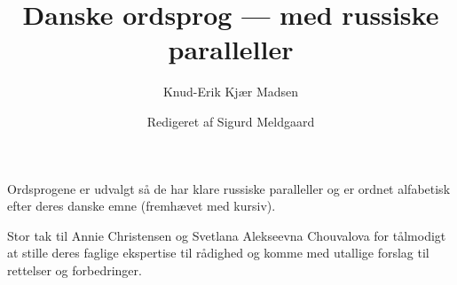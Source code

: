 \documentclass[a4paper]{article}
\title{Danske ordsprog --- med russiske paralleller}
\author{Knud-Erik Kjær Madsen \and Redigeret af Sigurd Meldgaard}
\date{}
\begin{document}
\maketitle
\newenvironment{overslist}
{}{}
\newcommand{\mitem}{\par\hangindent=0.35cm\textbullet\ }
\newcommand{\ordsprog}[2]{
\noindent
\begin{tabu}to \textwidth {XX[2]}
\textdanish{#1}
  &
\begin{overslist}%
\hangindent=0.35cm
\textbullet\
\begin{russian}#2\par
\end{russian}
\end{overslist}%
\end{tabu}
\vskip5mm
}
\newcommand{\ru}[1]{\begin{russian}#1\end{russian}}
\newenvironment{letter}[1]
{\vskip0.5cm \section*{#1}
}
{}
\newcommand{\dui}[1]{\index{dansk}{#1}}
\newcommand{\di}[1]{\index{dansk}{#1}#1}
\newcommand{\did}[2]{\index{dansk}{#1}#2}
\newcommand{\mw}[1]{\index{dansk}{#1}\emph{#1}}
\newcommand{\mwni}[1]{\emph{#1}}
\newcommand{\ri}[1]{\index{russisk}{#1}#1}
\newcommand{\rid}[2]{\index{russisk}{#1}#2}
\newcommand{\fn}[1]{}
Ordsprogene er udvalgt så de har klare russiske paralleller og er ordnet alfabetisk efter deres danske emne (fremhævet med kursiv).

Stor tak til Annie Christensen og Svetlana Alekseevna Chouvalova for tålmodigt at stille deres faglige ekspertise til rådighed og komme med utallige forslag til rettelser og forbedringer.
\end{document}
